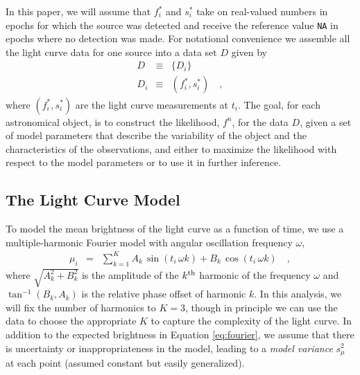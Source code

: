 \documentclass[12pt,preprint]{aastex}
\newcommand{\fobs}{f_i^*}
\newcommand{\sobs}{s_i^*}
\begin{document}
In this paper, we will assume that $\fobs$ and $\sobs$ take on real-valued numbers in epochs for which the source was detected and receive the reference value {\tt NA} in epochs where no detection was made. For notational convenience we assemble all the light curve data for one source into a data set $D$ given by
\begin{eqnarray}\displaystyle
D &\equiv& \{D_i\}
\\
D_i &\equiv& (\fobs, \sobs)
\quad ,
\end{eqnarray}
where $(\fobs, \sobs)$ are the light curve measurements  at $t_i$.  The goal, for each astronomical object, is to construct the likelihood, $f^n$, for the data $D$, given a set of model parameters that describe the variability of the object and the characteristics of the observations, and either to maximize the likelihood with respect to the model parameters or to use it in further inference.


\subsection{The Light Curve Model}

To model the mean brightness of the light curve as a function of time, we use a multiple-harmonic Fourier model with angular oscillation frequency $\omega$,
\begin{eqnarray}\displaystyle
\mu_i &=& \sum_{k=1}^K A_k\, \sin (t_i \, \omega  k) + B_k\, \cos (t_i \, \omega  k)
\quad ,\label{eq:fourier}
\end{eqnarray}
where $\sqrt{A_k^2 + B_k^2}$ is the amplitude of the $k^{\rm th}$ harmonic of the frequency $\omega$ and $\tan^{-1}(B_k,A_k)$ is the relative phase offset of harmonic $k$.  In this analysis, we will fix the number of harmonics to $K=3$, though in principle we can use the data to choose the appropriate $K$ to capture the complexity of the light curve.  In addition to the expected brightness in Equation \ref{eq:fourier}, we assume that there is uncertainty or inappropriateness in the model, leading to a \emph{model variance} $s_\mu^2$ at each point (assumed constant but easily generalized).
\end{document}
